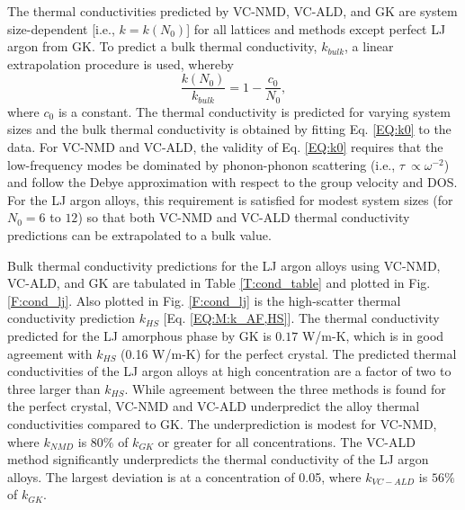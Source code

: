 The thermal conductivities predicted by VC-NMD, VC-ALD, and GK are system 
size-dependent [i.e., $k = k(N_0)$] for all lattices and methods except 
perfect LJ argon from GK.\cite{mcgaughey_quantitative_2004} 
To predict a bulk thermal conductivity, $k_{bulk}$,  
a linear extrapolation procedure is 
used, whereby 
\begin{equation}\label{EQ:k0}
\frac{k(N_0)}{k_{bulk}} = 1 - \frac{c_0}{N_0},
\end{equation}
where $c_0$ is a constant.\cite{turney_predicting_2009,
esfarjani_heat_2011,shiomi_thermal_2011} 
The thermal conductivity 
is predicted for varying system sizes and the bulk thermal conductivity 
is obtained by fitting Eq. \eqref{EQ:k0} to the data. 
For VC-NMD and VC-ALD, the validity of Eq. \eqref{EQ:k0}  
requires that the low-frequency modes be dominated by 
phonon-phonon scattering (i.e., $\tau\ \propto \omega^{-2}$) and  
follow the Debye approximation 
with respect to the group velocity and DOS.
\cite{shiomi_thermal_2011,esfarjani_heat_2011} For the LJ 
argon alloys, this requirement is satisfied for modest system sizes 
(for $N_0 = 6$ to $12$) so that both VC-NMD and VC-ALD thermal 
conductivity predictions can be extrapolated to a bulk value. 

Bulk thermal conductivity predictions for the LJ argon alloys using  
VC-NMD, VC-ALD, and GK are tabulated in Table \ref{T:cond_table} 
and plotted in Fig. \ref{F:cond_lj}. Also plotted 
in Fig. \ref{F:cond_lj} is the high-scatter   
thermal conductivity prediction $k_{HS}$ 
[Eq. \eqref{EQ:M:k_AF,HS}]. The thermal conductivity predicted 
for the LJ amorphous phase by GK is $0.17$ W/m-K,  
which is in good agreement with $k_{HS}$ (0.16 W/m-K) for the 
perfect crystal.  
The predicted thermal conductivities of the LJ argon alloys at high 
concentration are a factor of two to three larger than $k_{HS}$.  
While agreement between the three methods is found for the perfect 
crystal, VC-NMD and VC-ALD underpredict the alloy thermal 
conductivities compared to GK. 
The underprediction is modest for VC-NMD, where $k_{NMD}$ is 
$80\%$ of $k_{GK}$ or greater for all concentrations. The VC-ALD method 
significantly underpredicts the thermal conductivity of the LJ argon alloys. 
The largest deviation is at a concentration of 0.05, where 
$k_{VC-ALD}$ is $56\%$ of $k_{GK}$.

